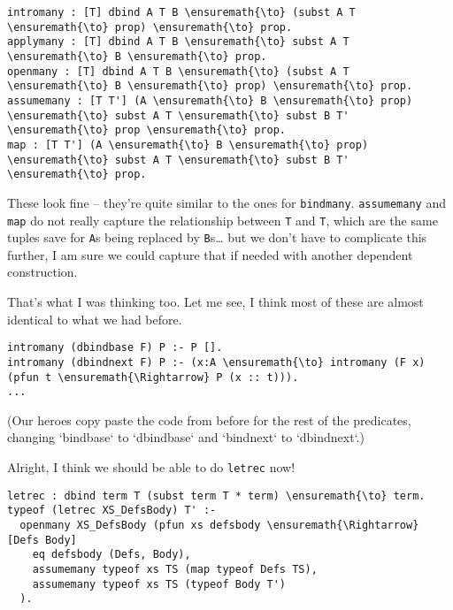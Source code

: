 \begin{verbatim}
intromany : [T] dbind A T B \ensuremath{\to} (subst A T \ensuremath{\to} prop) \ensuremath{\to} prop.
applymany : [T] dbind A T B \ensuremath{\to} subst A T \ensuremath{\to} B \ensuremath{\to} prop.
openmany : [T] dbind A T B \ensuremath{\to} (subst A T \ensuremath{\to} B \ensuremath{\to} prop) \ensuremath{\to} prop.
assumemany : [T T'] (A \ensuremath{\to} B \ensuremath{\to} prop) \ensuremath{\to} subst A T \ensuremath{\to} subst B T' \ensuremath{\to} prop \ensuremath{\to} prop.
map : [T T'] (A \ensuremath{\to} B \ensuremath{\to} prop) \ensuremath{\to} subst A T \ensuremath{\to} subst B T' \ensuremath{\to} prop.
\end{verbatim}

\heroADVISOR{} These look fine -- they're quite similar to the ones for
\texttt{bindmany}. \texttt{assumemany} and \texttt{map} do not really
capture the relationship between \texttt{T} and
\texttt{T\textquotesingle{}}, which are the same tuples save for
\texttt{A}s being replaced by \texttt{B}s\ldots{} but we don't have to
complicate this further, I am sure we could capture that if needed with
another dependent construction.

\heroSTUDENT{} That's what I was thinking too. Let me see, I think most of
these are almost identical to what we had before.

\begin{verbatim}
intromany (dbindbase F) P :- P [].
intromany (dbindnext F) P :- (x:A \ensuremath{\to} intromany (F x) (pfun t \ensuremath{\Rightarrow} P (x :: t))).
...
\end{verbatim}

\begin{scenecomment}
(Our heroes copy paste the code from before for the rest of the predicates,
changing `bindbase` to `dbindbase` and `bindnext` to `dbindnext`.)
\end{scenecomment}

\heroADVISOR{} Alright, I think we should be able to do \texttt{letrec} now!

\begin{verbatim}
letrec : dbind term T (subst term T * term) \ensuremath{\to} term.
typeof (letrec XS_DefsBody) T' :-
  openmany XS_DefsBody (pfun xs defsbody \ensuremath{\Rightarrow} [Defs Body]
    eq defsbody (Defs, Body),
    assumemany typeof xs TS (map typeof Defs TS),
    assumemany typeof xs TS (typeof Body T')
  ).
\end{verbatim}

